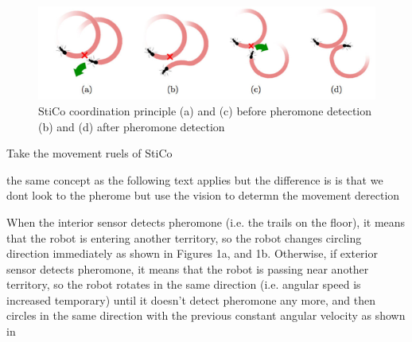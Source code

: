 \cite{ranjbar2012multi}
\begin{figure}[htp!]
\centering
\includegraphics[width=\columnwidth]{images/stico.png}
\caption{StiCo coordination principle (a) and (c) before pheromone detection (b) and (d) after pheromone detection}
\label{fig:overall}
\end{figure}

Take the movement ruels of StiCo

the same concept as the following text applies but the difference is is that we dont look to the pherome but use the vision to determn the movement derection 

When the interior sensor detects pheromone (i.e. the trails on the floor), it means that the robot is entering another territory, so the robot changes circling direction immediately as shown in Figures 1a, and 1b. Otherwise, if exterior sensor detects pheromone, it means that the robot is passing near another territory, so the robot rotates in the same direction (i.e. angular speed is increased temporary) until it doesn’t detect pheromone any more, and then circles in the same direction with the previous constant angular velocity as shown in 